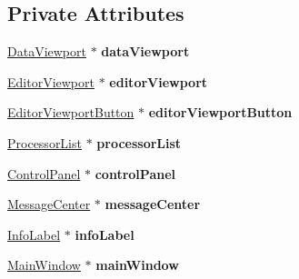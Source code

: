 \subsection*{Private Attributes}
\begin{DoxyCompactItemize}
\item 
\hypertarget{classUIComponent_a9d68e7a3a6a74613cba2152c14be3edf}{\hyperlink{classDataViewport}{Data\-Viewport} $\ast$ {\bfseries data\-Viewport}}\label{classUIComponent_a9d68e7a3a6a74613cba2152c14be3edf}

\item 
\hypertarget{classUIComponent_a04b249e3f62b57843fd02003606ff3d5}{\hyperlink{classEditorViewport}{Editor\-Viewport} $\ast$ {\bfseries editor\-Viewport}}\label{classUIComponent_a04b249e3f62b57843fd02003606ff3d5}

\item 
\hypertarget{classUIComponent_a75d4c61867b0f22ed838571a5747ef28}{\hyperlink{classEditorViewportButton}{Editor\-Viewport\-Button} $\ast$ {\bfseries editor\-Viewport\-Button}}\label{classUIComponent_a75d4c61867b0f22ed838571a5747ef28}

\item 
\hypertarget{classUIComponent_aad88597bcb3ed932d77d630e8788660c}{\hyperlink{classProcessorList}{Processor\-List} $\ast$ {\bfseries processor\-List}}\label{classUIComponent_aad88597bcb3ed932d77d630e8788660c}

\item 
\hypertarget{classUIComponent_a33bd55250d5ac56d8fb14d0674d183d9}{\hyperlink{classControlPanel}{Control\-Panel} $\ast$ {\bfseries control\-Panel}}\label{classUIComponent_a33bd55250d5ac56d8fb14d0674d183d9}

\item 
\hypertarget{classUIComponent_ac1cf64f19c2d9498bf51ca48862d1d29}{\hyperlink{classMessageCenter}{Message\-Center} $\ast$ {\bfseries message\-Center}}\label{classUIComponent_ac1cf64f19c2d9498bf51ca48862d1d29}

\item 
\hypertarget{classUIComponent_aaf91b15a8e81dbb6dc2d8b25a5937702}{\hyperlink{classInfoLabel}{Info\-Label} $\ast$ {\bfseries info\-Label}}\label{classUIComponent_aaf91b15a8e81dbb6dc2d8b25a5937702}

\item 
\hypertarget{classUIComponent_a664b9f862a4e9922729184fc76b5fd40}{\hyperlink{classMainWindow}{Main\-Window} $\ast$ {\bfseries main\-Window}}\label{classUIComponent_a664b9f862a4e9922729184fc76b5fd40}


\end{DoxyCompactItemize}
